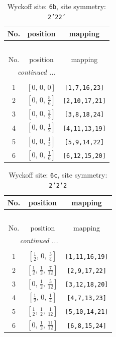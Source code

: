 \documentclass[fleqn,8pt]{jsarticle}
\begin{document}
\begin{longtable}{ccc}
\caption{Wyckoff site: {\tt 6b}, site symmetry: {\tt 2'22'}}
 \\
 \hline \hline
No. & position & mapping \\ \hline \endfirsthead

\multicolumn{2}{l}{\tablename\ \thetable{}} \\
 \hline \hline
No. & position & mapping \\ \hline \endhead

 \hline \hline
\multicolumn{2}{r}{\footnotesize\it continued ...} \\ \endfoot

 \hline \hline
\multicolumn{2}{r}{} \\ \endlastfoot

1 & $\left[ 0,\, 0,\, 0 \right]$ & {\tt [1,7,16,23]} \\ \hline
2 & $\left[ 0,\, 0,\, \frac{5}{6} \right]$ & {\tt [2,10,17,21]} \\ \hline
3 & $\left[ 0,\, 0,\, \frac{2}{3} \right]$ & {\tt [3,8,18,24]} \\ \hline
4 & $\left[ 0,\, 0,\, \frac{1}{2} \right]$ & {\tt [4,11,13,19]} \\ \hline
5 & $\left[ 0,\, 0,\, \frac{1}{3} \right]$ & {\tt [5,9,14,22]} \\ \hline
6 & $\left[ 0,\, 0,\, \frac{1}{6} \right]$ & {\tt [6,12,15,20]} \\
\end{longtable}
\renewcommand{\arraystretch}{1.2}
\begin{longtable}{ccc}
\caption{Wyckoff site: {\tt 6c}, site symmetry: {\tt 2'2'2}}
 \\
 \hline \hline
No. & position & mapping \\ \hline \endfirsthead

\multicolumn{2}{l}{\tablename\ \thetable{}} \\
 \hline \hline
No. & position & mapping \\ \hline \endhead

 \hline \hline
\multicolumn{2}{r}{\footnotesize\it continued ...} \\ \endfoot

 \hline \hline
\multicolumn{2}{r}{} \\ \endlastfoot

1 & $\left[ \frac{1}{2},\, 0,\, \frac{3}{4} \right]$ & {\tt [1,11,16,19]} \\ \hline
2 & $\left[ \frac{1}{2},\, \frac{1}{2},\, \frac{7}{12} \right]$ & {\tt [2,9,17,22]} \\ \hline
3 & $\left[ 0,\, \frac{1}{2},\, \frac{5}{12} \right]$ & {\tt [3,12,18,20]} \\ \hline
4 & $\left[ \frac{1}{2},\, 0,\, \frac{1}{4} \right]$ & {\tt [4,7,13,23]} \\ \hline
5 & $\left[ \frac{1}{2},\, \frac{1}{2},\, \frac{1}{12} \right]$ & {\tt [5,10,14,21]} \\ \hline
6 & $\left[ 0,\, \frac{1}{2},\, \frac{11}{12} \right]$ & {\tt [6,8,15,24]} \\
\end{longtable}
\end{document}
